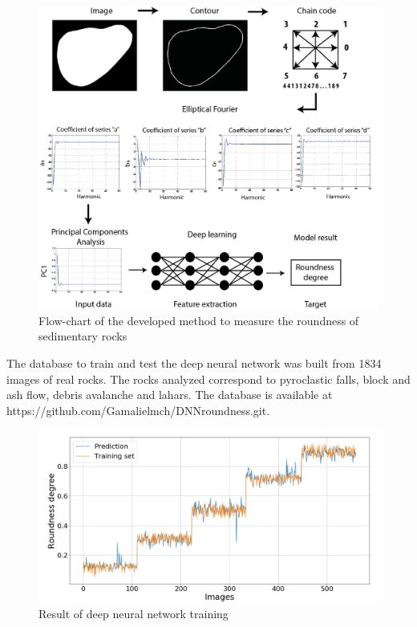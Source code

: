 \documentclass[conference]{IEEEtran}
\begin{document}
\begin{figure}[htbp]
\centerline{\includegraphics[scale=0.6]{fig5.png}}
\caption{Flow-chart of the developed method to measure the roundness of sedimentary rocks}
\label{fig5}
\end{figure}

The database to train and test the deep neural network was built from 1834 images of real rocks. The rocks analyzed correspond to pyroclastic falls, block and ash flow, debris avalanche and lahars. The database is available at https://github.com/Gamalielmch/DNN\textunderscore roundness.git.

\begin{figure}[htbp]
	\centerline{\includegraphics[scale=0.3]{fig6.png}}
	\caption{Result of deep neural network training}
	\label{fig6}
\end{figure}
\end{document}
